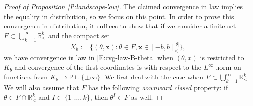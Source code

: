 \documentclass[11pt]{article}
\newcommand{\R}{\mathbb{R}}
\newcommand{\bx}{\mathbf{x}}
\theoremstyle{definition} %
\theoremstyle{remark} %
\begin{document}
\begin{proof}[Proof of Proposition \ref{P:landscape-law}]
The claimed convergence in law implies the equality in distribution, so we focus on this point. In order to prove this convergence in distribution, it suffices to show that if we consider a finite set $F \subset \bigcup_{k=1}^\infty \R^k_\le$ and the compact set
$$
K_b := \{(\theta, \bx) : \theta \in F, \bx \in [-b, b]^{|\theta|}_\le\}, 
$$
we have convergence in law in \eqref{E:cvg-law-B-theta} when $(\theta, x)$ is restricted to $K_b$ and convergence of the first coordinates is with respect to the $L^\infty$-norm on functions from $K_b \to \R \cup \{\pm \infty\}$. We first deal with the case when $F \subset \bigcup_{k=1}^\infty \R^k_<$. We will also assume that $F$ has the following \emph{downward closed} property: if $\theta \in F \cap \R^k_<$ and $I \subset \{1, \dots, k\}$, then $\theta^I \in F$ as well.


\end{proof}
\end{document}
